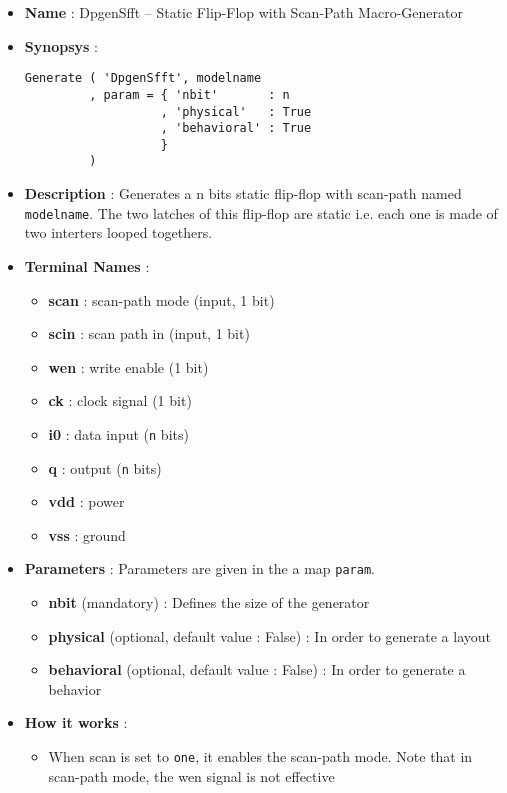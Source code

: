 \begin{itemize}
    \item \textbf{Name} : DpgenSfft -- Static Flip-Flop with Scan-Path Macro-Generator
    \item \textbf{Synopsys} :
\begin{verbatim}
Generate ( 'DpgenSfft', modelname
         , param = { 'nbit'       : n
                   , 'physical'   : True
                   , 'behavioral' : True         
                   }
         )
\end{verbatim}
    \item \textbf{Description} : Generates a n bits static flip-flop with scan-path named \verb-modelname-. The two latches of this flip-flop are static i.e. each one is made of two interters looped togethers.
    \item \textbf{Terminal Names} :
    \begin{itemize}
        \item \textbf{scan} : scan-path mode (input, 1 bit)
        \item \textbf{scin} : scan path in (input, 1 bit)
        \item \textbf{wen} : write enable (1 bit)
        \item \textbf{ck} : clock signal (1 bit)
        \item \textbf{i0} : data input (\verb-n- bits)
        \item \textbf{q} : output (\verb-n- bits)
        \item \textbf{vdd} : power
        \item \textbf{vss} : ground
    \end{itemize}
    \item \textbf{Parameters} : Parameters are given in the a map \verb-param-.
    \begin{itemize}
        \item \textbf{nbit} (mandatory) : Defines the size of the generator
        \item \textbf{physical} (optional, default value : False) : In order to generate a layout
        \item \textbf{behavioral} (optional, default value : False) : In order to generate a behavior        
    \end{itemize}
    \item \textbf{How it works} : 
    \begin{itemize}
        \item When scan is set to \verb-one-, it enables the scan-path mode. Note that in scan-path mode, the wen signal is not effective

\end{itemize}
\end{itemize}

